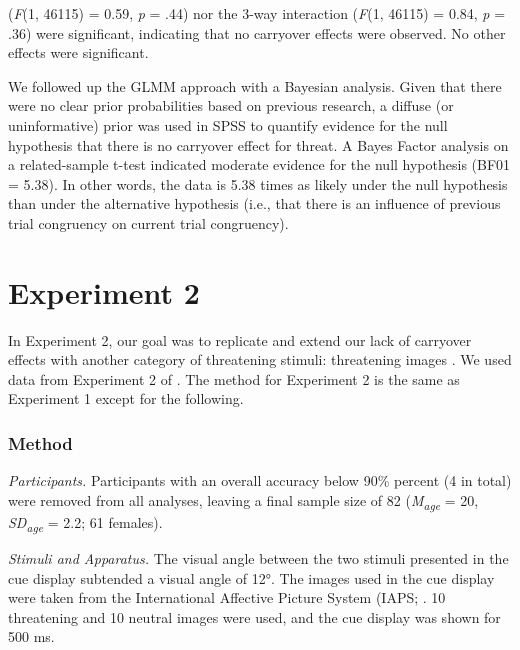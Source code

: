 \documentclass{article}
\begin{document}
(\emph{F}(1, 46115) = 0.59, \emph{p }= .44) nor the 3-way interaction (\emph{F}(1, 46115) = 0.84, \emph{p }= .36) were significant, indicating that no carryover effects were observed. No other effects were significant.



	We followed up the GLMM approach with a Bayesian analysis{\color{4472C4}. Given that} {\color{4472C4}there were no clear prior probabilities based on previous research, a diffuse (or uninformative) prior was used} {\color{4472C4}in SPSS }to quantify evidence for the null hypothesis that there is no carryover effect for threat. A Bayes Factor analysis on a related-sample t-test indicated moderate evidence for the null hypothesis (BF01 = 5.38). In other words, the data is 5.38 times as likely under the null hypothesis than under the alternative hypothesis (i.e., that there is an influence of previous trial congruency on current trial congruency).



	\section{Experiment 2}



	In Experiment 2, our goal was to replicate and extend our lack of carryover effects with another category of threatening stimuli: threatening images \textcite{[object Object]}. We used data from Experiment 2 of \textcite{[object Object]}. The method for Experiment 2 is the same as Experiment 1 except for the following.



	\subsubsection{Method}



	\emph{Participants. }Participants with an overall accuracy below 90\% percent (4 in total) were removed from all analyses, leaving a final sample size of 82 (\emph{M}\textsubscript{\emph{age}} = 20, \emph{SD}\textsubscript{\emph{age}} = 2.2; 61 females).



	\emph{Stimuli and Apparatus. }The visual angle between the two stimuli presented in the cue display subtended a visual angle of 12°. The images used in the cue display were taken from the International Affective Picture System (IAPS; \textcite{[object Object]}. 10 threatening and 10 neutral images were used, and the cue display was shown for 500 ms.
\end{document}
